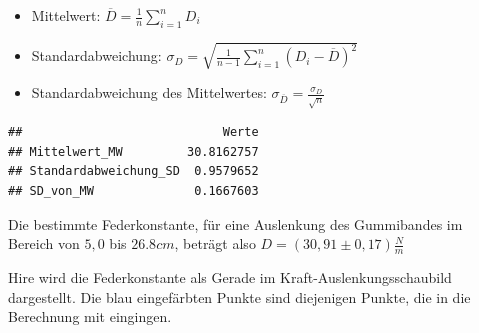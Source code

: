 \documentclass[
]{article}
\newenvironment{Shaded}{\begin{snugshade}}{\end{snugshade}}
\newcommand{\AttributeTok}[1]{\textcolor[rgb]{0.77,0.63,0.00}{#1}}
\newcommand{\CommentTok}[1]{\textcolor[rgb]{0.56,0.35,0.01}{\textit{#1}}}
\newcommand{\FloatTok}[1]{\textcolor[rgb]{0.00,0.00,0.81}{#1}}
\newcommand{\FunctionTok}[1]{\textcolor[rgb]{0.00,0.00,0.00}{#1}}
\newcommand{\NormalTok}[1]{#1}
\newcommand{\OtherTok}[1]{\textcolor[rgb]{0.56,0.35,0.01}{#1}}
\newcommand{\SpecialCharTok}[1]{\textcolor[rgb]{0.00,0.00,0.00}{#1}}
\newcommand{\StringTok}[1]{\textcolor[rgb]{0.31,0.60,0.02}{#1}}
\providecommand{\tightlist}{%
  \setlength{\itemsep}{0pt}\setlength{\parskip}{0pt}}
\begin{document}
\begin{itemize}
\tightlist
\item
  Mittelwert: \(\overline{D} = \frac{1}{n}\sum \limits_{i=1}^nD_i\)
\item
  Standardabweichung:
  \(\sigma_D = \sqrt{\frac{1}{n-1} \sum_{i=1}^n (D_i - \overline{D})^2}\)
\item
  Standardabweichung des Mittelwertes:
  \(\sigma_{\overline{D}}=\frac{\sigma_D}{\sqrt{n}}\)
\end{itemize}

\begin{Shaded}
\end{Shaded}

\begin{verbatim}
##                            Werte
## Mittelwert_MW         30.8162757
## Standardabweichung_SD  0.9579652
## SD_von_MW              0.1667603
\end{verbatim}

Die bestimmte Federkonstante, für eine Auslenkung des Gummibandes im
Bereich von \(5,0\) bis \(26.8cm\), beträgt also
\(D=(30,91\pm 0,17)\frac{N}{m}\)

Hire wird die Federkonstante als Gerade im Kraft-Auslenkungsschaubild
dargestellt. Die blau eingefärbten Punkte sind diejenigen Punkte, die in
die Berechnung mit eingingen.
\end{document}
